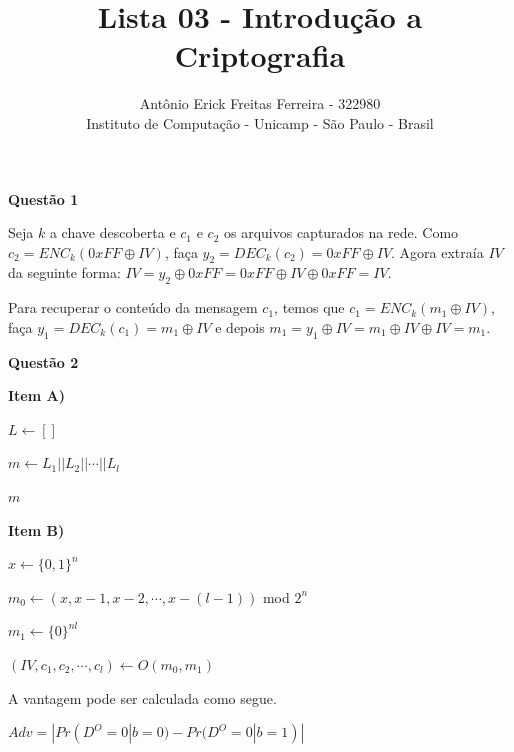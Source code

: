 \documentclass{article}
\title{Lista 03 - Introdução a Criptografia}
\author{Antônio Erick Freitas Ferreira - 322980\\
        \small Instituto de Computação - Unicamp - São Paulo - Brasil
}
\begin{document}
\maketitle

\textbf{Questão 1}

    Seja $k$ a chave descoberta e $c_1$ e $c_2$ os arquivos capturados na rede. Como $c_2 = ENC_k (0xFF \oplus IV)$, faça $y_2 = DEC_k(c_2) = 0xFF \oplus IV$. Agora extraía $IV$ da seguinte forma: $IV = y_2 \oplus 0xFF = 0xFF \oplus IV \oplus 0xFF = IV$.

    Para recuperar o conteúdo da mensagem $c_1$, temos que $c_1 = ENC_k(m_1 \oplus IV)$, faça $y_1 = DEC_k(c_1) = m_1 \oplus IV$ e depois $m_1 = y_1 \oplus IV = m_1 \oplus IV \oplus IV = m_1$.

\textbf{Questão 2}

\textbf{Item A)}

    \begin{algorithm}[H]
        \caption{Desencriptador}
    
        $L \leftarrow []$


        $m \leftarrow L_1||L_2||\cdots||L_l$

        \Return $m$
    \end{algorithm}


\textbf{Item B)}

    \begin{algorithm}[H]
        \caption{Ditinguidor D}

        $x \leftarrow \{0,1\}^n$

        $m_0 \leftarrow (x, x-1,x-2,\cdots,x-(l - 1))$ mod $2^n$

        $m_1 \leftarrow \{0\}^{nl}$

        $(IV, c_1, c_2,\cdots,c_l) \leftarrow O(m_0,m_1)$

    \end{algorithm}

    A vantagem pode ser calculada como segue.

    $Adv = |Pr(D^O = 0 | b = 0) - Pr(D^O = 0 |b = 1)|$
\end{document}
